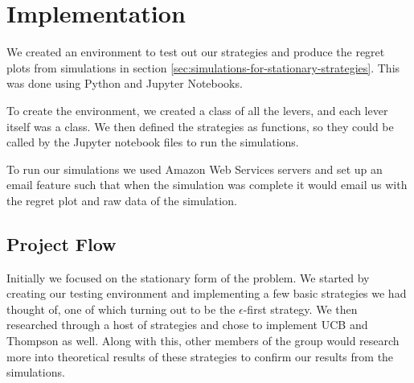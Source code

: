 \section{Implementation}\label{sec:implementation}

We created an environment to test out our strategies and produce the regret plots from simulations in section \ref{sec:simulations-for-stationary-strategies}.
This was done using Python and Jupyter Notebooks.

To create the environment, we created a class of all the levers, and each lever itself was a class.
We then defined the strategies as functions, so they could be called by the Jupyter notebook files to run the simulations.

To run our simulations we used Amazon Web Services servers and set up an email feature such that when the simulation was complete it would email us with the regret plot and raw data of the simulation.

\subsection{Project Flow}\label{subsec:project-flow}

Initially we focused on the stationary form of the problem.
We started by creating our testing environment and implementing a few basic strategies we had thought of, one of which turning out to be the $\epsilon$-first strategy.
We then researched through a host of strategies and chose to implement UCB and Thompson as well.
Along with this, other members of the group would research more into theoretical results of these strategies to confirm our results from the simulations.

\begin{center}
\end{center}